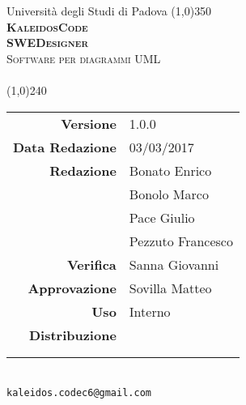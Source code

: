 \documentclass[a4paper,12pt]{article}
\author{KaleidosCode}
\date{03/03/2017}	%
\begin{document}
	\begin{titlepage}
		\centering Università degli Studi di Padova
		\line(1,0){350}\\
		\vspace{0.4cm}
		{\bfseries\scshape\LARGE KaleidosCode\\}
		\vspace{0.4cm}
		{\bfseries\scshape\LARGE SWEDesigner\\}
		{\scshape\Large Software per diagrammi UML\\}
		\vspace{1cm}
		{\scshape\Large \normediprogettoi\ \\}		%
		\vspace{1.4cm}
		\logo
		\vspace{1.2cm}
		\line(1,0){240}\\
		\begin{tabular}{r|l}
			{\hfill \textbf{Versione}} 			& 1.0.0\\
			{\hfill \textbf{Data Redazione}} 	& 03/03/2017\\	%
			{\hfill \textbf{Redazione}} 		& Bonato Enrico\\ & Bonolo Marco\\ & Pace Giulio\\ & Pezzuto Francesco\\
			{\hfill \textbf{Verifica}} 			& Sanna Giovanni\\
			{\hfill \textbf{Approvazione}} 		& Sovilla Matteo\\
			{\hfill \textbf{Uso}} 				& Interno\\
			{\hfill \textbf{Distribuzione}} 	& \vardanega \\ & \cardin \\ & \proponente\\
		\end{tabular}\\
		\vspace{2cm}
		\texttt{kaleidos.codec6@gmail.com}
	\end{titlepage}

	\pagestyle{myfront}
	\newpage
		
	\newpage
		\tableofcontents
	\pagestyle{mymain}
	\newpage
		
	\newpage
		
	\newpage
		
	\newpage
		
	\newpage
		
	\label{LastPage}
\end{document}
